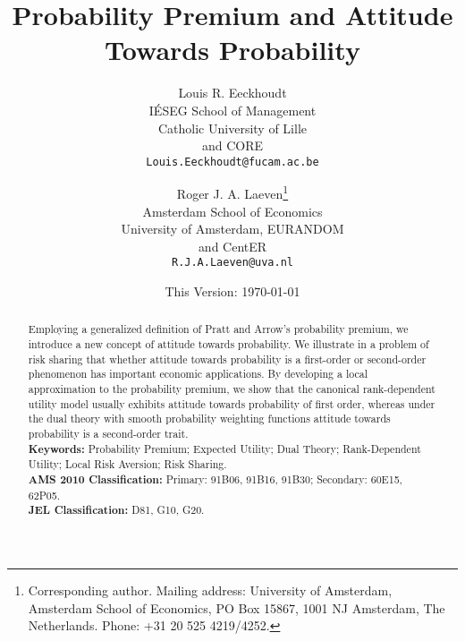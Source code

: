 \documentclass[11pt]{article}
\begin{document}
\title{\vskip -0.4cm
Probability Premium and Attitude Towards Probability
}
\author{Louis R. Eeckhoudt\\
{\footnotesize I\'ESEG School of Management}\\
{\footnotesize Catholic University of Lille}\\
{\footnotesize and CORE}\\
{\footnotesize {\tt Louis.Eeckhoudt@fucam.ac.be}}\\\and Roger J. A. Laeven\thanks{Corresponding author.
Mailing address: University of Amsterdam, Amsterdam School of Economics, PO Box 15867, 1001 NJ Amsterdam, The Netherlands.
Phone: +31 20 525 4219/4252.}\\
{\footnotesize Amsterdam School of Economics}\\
{\footnotesize University of Amsterdam, EURANDOM}\\
{\footnotesize and CentER}\\
{\footnotesize {\tt R.J.A.Laeven@uva.nl}}\\
[0.0cm]}
\date{This Version:
\today} \maketitle
\begin{abstract}
Employing a 
generalized definition 
of Pratt \cite{P64} and Arrow's \cite{A65,A71}
probability premium,
we introduce a new concept of attitude towards probability.
We illustrate in a problem of risk sharing that whether attitude towards probability is a first-order or second-order phenomenon
has 
important 
economic applications. 
By developing a local approximation to the probability premium,
we show that the canonical rank-dependent utility model usually exhibits attitude towards probability of first order,
whereas under the dual theory with smooth probability weighting functions attitude towards probability is a second-order trait. 
\noindent
\\[4mm]\noindent\textbf{Keywords:}
Probability Premium; Expected Utility; Dual Theory; Rank-Dependent Utility;
Local Risk Aversion; Risk Sharing.
\\[4mm]\noindent\textbf{AMS 2010 Classification:} Primary: 91B06, 91B16, 91B30; Secondary: 60E15, 62P05.
\\[4mm]\noindent\textbf{JEL Classification:} D81, G10, G20.
\end{abstract}
\end{document}
